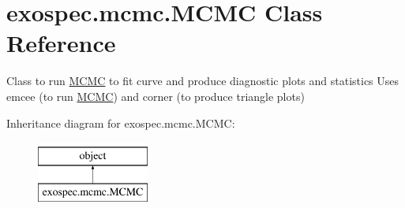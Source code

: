 \hypertarget{classexospec_1_1mcmc_1_1_m_c_m_c}{}\section{exospec.\+mcmc.\+M\+C\+MC Class Reference}
\label{classexospec_1_1mcmc_1_1_m_c_m_c}


Class to run \hyperlink{classexospec_1_1mcmc_1_1_m_c_m_c}{M\+C\+MC} to fit curve and produce diagnostic plots and statistics Uses emcee (to run \hyperlink{classexospec_1_1mcmc_1_1_m_c_m_c}{M\+C\+MC}) and corner (to produce triangle plots)  


Inheritance diagram for exospec.\+mcmc.\+M\+C\+MC\+:\begin{figure}[H]
\begin{center}
\leavevmode
\includegraphics[height=2.000000cm]{classexospec_1_1mcmc_1_1_m_c_m_c}
\end{center}
\end{figure}
